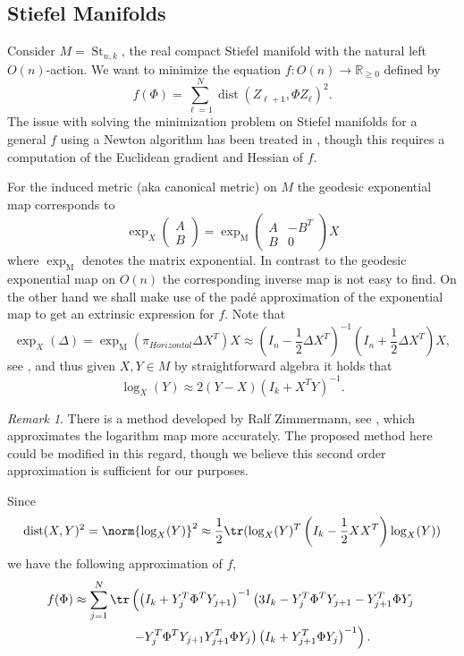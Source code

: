 \documentclass[12pt,a4paper]{article}
\theoremstyle{definition}
\theoremstyle{remark}
\newtheorem*{remark}{Remark}
\DeclareMathOperator{\dist}{dist}
\DeclareMathOperator{\St}{St}
\begin{document}
\subsection{Stiefel Manifolds}
\label{sec:stief}

Consider  $M=\St_{n,k}$, the real compact Stiefel manifold with the natural left $O(n)$-action. We want to minimize the equation $f:O(n)\rightarrow \mathbb{R}_{\geq 0}$ defined by
\[
f(\Phi) = \sum_{\ell=1}^N \dist(Z_{\ell+1},\Phi Z_{\ell})^2.
\]
The issue with solving the minimization problem on Stiefel manifolds for a general $f$ using a Newton algorithm has been treated in \cite{edelman1998geometry}, though this requires a computation of the Euclidean gradient and Hessian of $f$.

For the induced metric (aka canonical metric) on $M$ the geodesic exponential map corresponds to
\[
\exp_X\begin{pmatrix}
A\\ B
\end{pmatrix}= \exp_{\mathrm{M}} \begin{pmatrix}
A & -B^T\\ B& 0
\end{pmatrix} X
\]
where $\exp_{\mathrm{M}}$ denotes the matrix exponential. In contrast to the geodesic exponential map on $O(n)$ the corresponding inverse map is not easy to find. On the other hand we shall make use of the pad\'e approximation of the exponential map to get an extrinsic expression for $f$. Note that
\[
\exp_X(\Delta)=\exp_{\mathrm{M}}(\pi_{Horizontal}\Delta X^T)X \approx \left(I_n-\frac{1}{2}\Delta X^T \right)^{-1} \left(I_n+\frac{1}{2}\Delta X^T\right)X,
\]
see \cite{jauch2020random,yuan2019global,zhu2019matrix}, and thus given $X,Y\in M$ by straightforward algebra it holds that
\[
\log_X(Y)\approx 2(Y-X) (I_k +X^TY)^{-1}.
\]
\begin{remark}
There is a method developed by Ralf Zimmermann, see \cite{zimmermann2017matrix}, which approximates the logarithm map more accurately. The proposed method here could be modified in this regard, though we believe this second order approximation is sufficient for our purposes.
\end{remark}
Since 
\[
\dist(X,Y)^2= \norm{\log_X(Y)}^2 \approx \frac{1}{2} \tr(\log_X(Y)^T \left(I_k-\frac{1}{2} XX^T\right)\log_X(Y))
\]
we have the following approximation of $f$,
\[
\begin{aligned}
f(\Phi) \approx \sum_{j=1}^N \tr &\left(\left(I_k+Y^T_{j}\Phi^T Y_{j+1}\right)^{-1}\left( 3I_k - Y_j^T \Phi^TY_{j+1}-Y_{j+1}^T \Phi Y_j\right.\right.\\ 
& \left. \left.- Y_j^T\Phi^T Y_{j+1} Y_{j+1}^T \Phi Y_j\right) \left( I_k +Y_{j+1}^T \Phi Y_j\right)^{-1} \right).
\end{aligned}
\]
\end{document}
